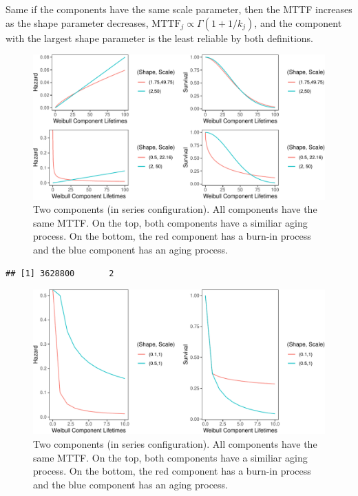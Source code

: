 \documentclass[
]{article}
\begin{document}
Same if the components have the same scale parameter, then the MTTF
increases as the shape parameter decreases,
\(\text{MTTF}_j \propto \Gamma(1 + 1/k_j)\), and the component with the
largest shape parameter is the least reliable by both definitions.

\begin{figure}

{\centering \includegraphics{wei_series_md_files/figure-latex/exp_weib_haz-1} 

}

\caption{Two components (in series configuration). All components have the same MTTF. On the top, both components have a similiar aging process. On the bottom, the red component has a burn-in process and the blue component has an aging process.}\label{fig:exp_weib_haz}
\end{figure}

\begin{verbatim}
## [1] 3628800       2
\end{verbatim}

\begin{figure}

{\centering \includegraphics{wei_series_md_files/figure-latex/exp_weib_haz-2-1} 

}

\caption{Two components (in series configuration). All components have the same MTTF. On the top, both components have a similiar aging process. On the bottom, the red component has a burn-in process and the blue component has an aging process.}\label{fig:exp_weib_haz-2}
\end{figure}
\end{document}
